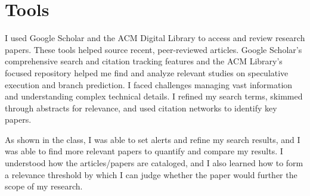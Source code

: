 \documentclass{article}
\begin{document}
\section{Tools}
I used Google Scholar and the ACM Digital Library to access and review research papers. These tools helped source recent, peer-reviewed articles. Google Scholar's comprehensive search and citation tracking features and the ACM Library's focused repository helped me find and analyze relevant studies on speculative execution and branch prediction. I faced challenges managing vast information and understanding complex technical details. I  refined my search terms, skimmed through abstracts for relevance, and used citation networks to identify key papers. 

As shown in the class, I was able to set alerts and refine my search results, and I was able to find more relevant papers to quantify and compare my results. I understood how the articles/papers are cataloged, and I also learned how to form a relevance threshold by which I can judge whether the paper would further the scope of my research. 



\end{document}

